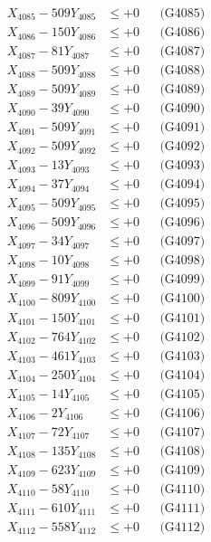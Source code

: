 \documentclass[a4paper,10pt]{article}
\begin{document}
{\begin{align}
X_{4085} - 509Y_{4085} &\leq +0 && \text{(G4085)} \\
X_{4086} - 150Y_{4086} &\leq +0 && \text{(G4086)} \\
X_{4087} - 81Y_{4087} &\leq +0 && \text{(G4087)} \\
X_{4088} - 509Y_{4088} &\leq +0 && \text{(G4088)} \\
X_{4089} - 509Y_{4089} &\leq +0 && \text{(G4089)} \\
X_{4090} - 39Y_{4090} &\leq +0 && \text{(G4090)} \\
\allowbreak
X_{4091} - 509Y_{4091} &\leq +0 && \text{(G4091)} \\
X_{4092} - 509Y_{4092} &\leq +0 && \text{(G4092)} \\
X_{4093} - 13Y_{4093} &\leq +0 && \text{(G4093)} \\
X_{4094} - 37Y_{4094} &\leq +0 && \text{(G4094)} \\
X_{4095} - 509Y_{4095} &\leq +0 && \text{(G4095)} \\
X_{4096} - 509Y_{4096} &\leq +0 && \text{(G4096)} \\
X_{4097} - 34Y_{4097} &\leq +0 && \text{(G4097)} \\
X_{4098} - 10Y_{4098} &\leq +0 && \text{(G4098)} \\
X_{4099} - 91Y_{4099} &\leq +0 && \text{(G4099)} \\
X_{4100} - 809Y_{4100} &\leq +0 && \text{(G4100)} \\
\allowbreak
X_{4101} - 150Y_{4101} &\leq +0 && \text{(G4101)} \\
X_{4102} - 764Y_{4102} &\leq +0 && \text{(G4102)} \\
X_{4103} - 461Y_{4103} &\leq +0 && \text{(G4103)} \\
X_{4104} - 250Y_{4104} &\leq +0 && \text{(G4104)} \\
X_{4105} - 14Y_{4105} &\leq +0 && \text{(G4105)} \\
X_{4106} - 2Y_{4106} &\leq +0 && \text{(G4106)} \\
X_{4107} - 72Y_{4107} &\leq +0 && \text{(G4107)} \\
X_{4108} - 135Y_{4108} &\leq +0 && \text{(G4108)} \\
X_{4109} - 623Y_{4109} &\leq +0 && \text{(G4109)} \\
X_{4110} - 58Y_{4110} &\leq +0 && \text{(G4110)} \\
\allowbreak
X_{4111} - 610Y_{4111} &\leq +0 && \text{(G4111)} \\
X_{4112} - 558Y_{4112} &\leq +0 && \text{(G4112)} \\

\end{align}}
\end{document}
